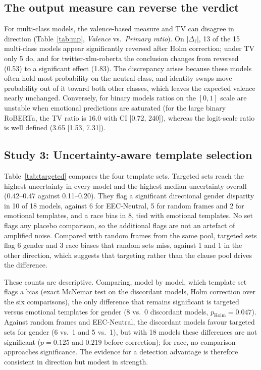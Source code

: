 \documentclass[runningheads]{llncs}
\begin{document}
\subsection{The output measure can reverse the verdict}\label{sec:measure}
For multi-class models, the valence-based measure and TV can disagree in
direction (Table~\ref{tab:mp}, \emph{Valence} vs.\ \emph{Primary ratio}). On
$|\Delta_\ell|$, 13 of the 15 multi-class models appear significantly reversed
after Holm correction; under TV only 5 do, and for twitter-xlm-roberta the
conclusion changes from reversed (0.53) to a significant effect (1.83). The discrepancy arises because these
models often hold most probability on the neutral class, and identity swaps move
probability out of it toward both other classes, which leaves the expected
valence nearly unchanged. Conversely, for binary models ratios on the $[0,1]$
scale are unstable when emotional predictions are saturated (for the large
binary RoBERTa, the TV ratio is 16.0 with CI [0.72, 240]), whereas the
logit-scale ratio is well defined (3.65 [1.53, 7.31]).

\subsection{Study 3: Uncertainty-aware template selection}\label{sec:targeted}
Table~\ref{tab:targeted} compares the four template sets. Targeted sets reach
the highest uncertainty in every model and the highest median uncertainty
overall (0.42--0.47 against 0.11--0.20). They flag a significant directional
gender disparity in 10 of 18 models, against 6 for EEC-Neutral, 5 for random frames and 2 for
emotional templates, and a race bias in 8, tied with emotional templates. No set
flags any placebo comparison, so the additional flags are not an artefact
of amplified noise. Compared with random frames from the same pool, targeted
sets flag 6 gender and 3 race biases that random sets miss, against 1 and 1 in
the other direction, which suggests that targeting rather than the clause pool
drives the difference.

These counts are descriptive. Comparing, model by model, which template set
flags a bias (exact McNemar test on the discordant models, Holm correction over
the six comparisons), the only difference that remains significant is targeted
versus emotional templates for gender (8 vs.\ 0 discordant models,
$p_{\text{Holm}}=0.047$). Against random frames and EEC-Neutral, the discordant
models favour targeted sets for gender (6 vs.\ 1 and 5 vs.\ 1), but with 18
models these differences are not significant ($p=0.125$ and $0.219$ before
correction); for race, no comparison approaches significance. The evidence for a
detection advantage is therefore consistent in direction but modest in strength.
\end{document}

